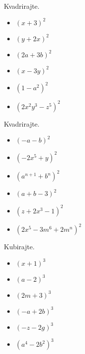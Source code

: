                 \begin{naloga}
                    Kvadrirajte.
                    \begin{itemize}
                        \item $(x+3)^2$ 
                        \item $(y+2x)^2$ 
                        \item $(2a+3b)^2$ 
                        \item $(x-3y)^2$ 
                        \item $(1-a^2)^2$ 
                        \item $(2x^2y^3-z^5)^2$ 
                    \end{itemize}
                \end{naloga}


                \begin{naloga}
                    Kvadrirajte.
                    \begin{itemize}
                        \item $(-a-b)^2$ 
                        \item $(-2x^5+y)^2$ 
                        \item $(a^{n+1}+b^n)^2$ 
                        \item $(a+b-3)^2$ 
                        \item $(z+2x^3-1)^2$ 
                        \item $(2x^5-3m^6+2m^n)^2$ 
                    \end{itemize}
                \end{naloga}


                \begin{naloga}
                    Kubirajte.
                    \begin{itemize}
                        \item $(x+1)^3$ 
                        \item $(a-2)^3$ 
                        \item $(2m+3)^3$ 
                        \item $(-a+2b)^3$ 
                        \item $(-z-2g)^3$ 
                        \item $(a^4-2b^2)^3$ 
                    \end{itemize}
                \end{naloga}


